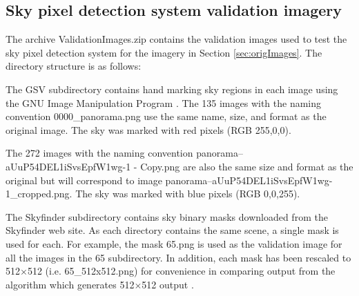 \documentclass[final,3p,times,authoryear]{elsarticle}
\begin{document}
\subsection{Sky pixel detection system validation imagery}\label{sec:valImages}

The archive ValidationImages.zip contains the validation images used to test the \cite{Nice2019UC} sky pixel detection system for the imagery in Section \ref{sec:origImages}. The directory structure is as follows:


The GSV subdirectory contains hand marking sky regions in each image using the GNU Image Manipulation Program \citep{GIMP2019}. The 135 images with the naming convention 0000\_panorama.png use the same name, size, and format as the original image. The sky was marked with red pixels (RGB 255,0,0). 

The 272 images with the naming convention panorama--aUuP54DEL1iSvsEpfW1wg-1 - Copy.png are also the same size and format as the original but will correspond to image  panorama--aUuP54DEL1iSvsEpfW1wg-1\_cropped.png. The sky was marked with blue pixels (RGB 0,0,255).

The Skyfinder subdirectory contains sky binary masks downloaded from the Skyfinder web site. As each directory contains the same scene, a single mask is used for each. For example, the mask 65.png is used as the validation image for all the images in the 65 subdirectory. In addition, each mask has been rescaled to 512$\times$512 (i.e. 65\_512x512.png) for convenience in comparing output from the \cite{Middel2018} algorithm which generates 512$\times$512 output .



%
%
%
\end{document}

